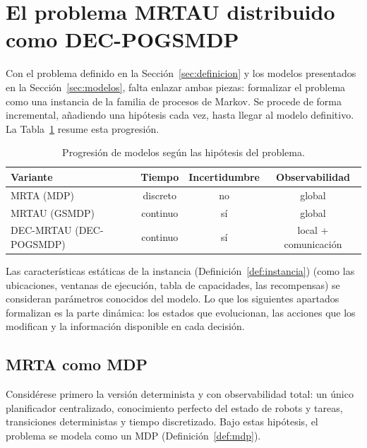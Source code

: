 \section{El problema MRTAU distribuido como DEC-POGSMDP} \label{sec:formalizacion} %
 
Con el problema definido en la Sección~\ref{sec:definicion} y los modelos presentados en la Sección~\ref{sec:modelos}, falta enlazar ambas piezas: formalizar el problema como una instancia de la familia de procesos de Markov. Se procede de forma incremental, añadiendo una hipótesis cada vez, hasta llegar al modelo definitivo. La Tabla~\ref{tab:progresion} resume esta progresión.
 
\begin{table}[t] 
    \centering 
    \caption{Progresión de modelos según las hipótesis del problema.} \label{tab:progresion} 
    \begin{tabular}{lccc} 
    \hline \textbf{Variante} & \textbf{Tiempo} & \textbf{Incertidumbre} & \textbf{Observabilidad} \\ 
    \hline MRTA (MDP)     & discreto & no & global 
    \\ MRTAU (GSMDP)   & continuo & sí & global 
    \\ DEC-MRTAU (DEC-POGSMDP) & continuo & sí & local + comunicación 
    \\ \hline 
    \end{tabular} 
\end{table}
 
Las características estáticas de la instancia (Definición~\ref{def:instancia}) (como las ubicaciones, ventanas de ejecución, tabla de capacidades, las recompensas) se consideran parámetros conocidos del modelo. Lo que los siguientes apartados formalizan es la parte dinámica: los estados que evolucionan, las acciones que los modifican y la información disponible en cada decisión.


\subsection{MRTA como MDP} \label{subsec:mrta-mdp} %

Considérese primero la versión determinista y con observabilidad total: un único planificador centralizado, conocimiento perfecto del estado de robots y tareas, transiciones deterministas y tiempo discretizado. Bajo estas hipótesis, el problema se modela como un MDP (Definición~\ref{def:mdp}).

